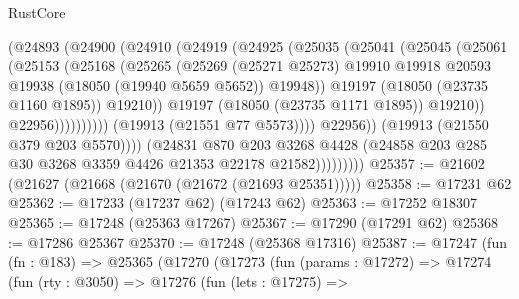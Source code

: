 \begin{lexlean}{RustCore}
\begin{coremodule}
                                    (@24893
                                      (@24900
                                        (@24910
                                          (@24919
                                            (@24925
                                              (@25035
                                                (@25041
                                                  (@25045
                                                    (@25061
                                                      (@25153
                                                        (@25168
                                                          (@25265
                                                            (@25269
                                                              (@25271 @25273)
                                                              @19910
                                                              @19918
                                                              @20593
                                                              @19938
                                                              (@18050 (@19940 @5659 @5652))
                                                              @19948))
                                                          @19197
                                                          (@18050 (@23735 @1160 @1895))
                                                          @19210))
                                                      @19197
                                                      (@18050 (@23735 @1171 @1895))
                                                      @19210))
                                                  @22956))))))))))
                              (@19913 (@21551 @77 @5573))))
                          @22956))
                      (@19913 (@21550 @379 @203 @5570))))
                  (@24831
                    @870
                    @203
                    @3268
                    @4428
                    (@24858 @203 @285 @30 @3268 @3359 @4426 @21353 @22178 @21582)))))))))
@25357 := @21602 (@21627 (@21668 (@21670 (@21672 (@21693 @25351)))))
@25358 := @17231 @62
@25362 := @17233 (@17237 @62) (@17243 @62)
@25363 := @17252 @18307
@25365 := @17248 (@25363 @17267)
@25367 := @17290 (@17291 @62)
@25368 := @17286 @25367
@25370 := @17248 (@25368 @17316)
@25387 := @17247
    (fun (fn : @183) =>
    @25365
      (@17270
        (@17273
          (fun (params : @17272) =>
          @17274
            (fun (rty : @3050) =>
            @17276
              (fun (lets : @17275) =>

\end{coremodule}
\end{lexlean}
